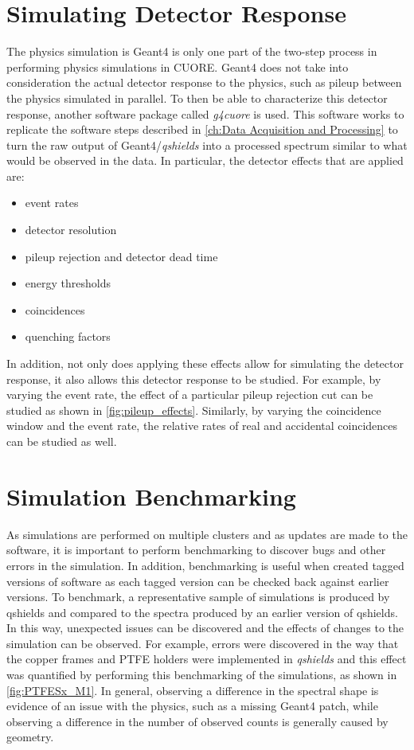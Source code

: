 \section{Simulating Detector Response}
The physics simulation is Geant4 is only one part of the two-step process in performing physics simulations in CUORE.
Geant4 does not take into consideration the actual detector response to the physics, such as pileup between the physics simulated in parallel.
To then be able to characterize this detector response, another software package called \textit{g4cuore} is used.
This software works to replicate the software steps described in \autoref{ch:Data Acquisition and Processing} to turn the raw output of Geant4/\textit{qshields} into a processed spectrum similar to what would be observed in the data.
In particular, the detector effects that are applied are:
\begin{itemize}
    \item event rates
    \item detector resolution
    \item pileup rejection and detector dead time
    \item energy thresholds
    \item coincidences 
    \item quenching factors
\end{itemize}
In addition, not only does applying these effects allow for simulating the detector response, it also allows this detector response to be studied.
For example, by varying the event rate, the effect of a particular pileup rejection cut can be studied as shown in \autoref{fig:pileup_effects}.
Similarly, by varying the coincidence window and the event rate, the relative rates of real and accidental coincidences can be studied as well.


\section{Simulation Benchmarking}

As simulations are performed on multiple clusters and as updates are made to the software, it is important to perform benchmarking to discover bugs and other errors in the simulation.
In addition, benchmarking is useful when created tagged versions of software as each tagged version can be checked back against earlier versions.
To benchmark, a representative sample of simulations is produced by qshields and compared to the spectra produced by an earlier version of qshields.
In this way, unexpected issues can be discovered and the effects of changes to the simulation can be observed.
For example, errors were discovered in the way that the copper frames and PTFE holders were implemented in \textit{qshields} and this effect was quantified by performing this benchmarking of the simulations, as shown in \autoref{fig:PTFESx_M1}.
In general, observing a difference in the spectral shape is evidence of an issue with the physics, such as a missing Geant4 patch, while observing a difference in the number of observed counts is generally caused by geometry.

